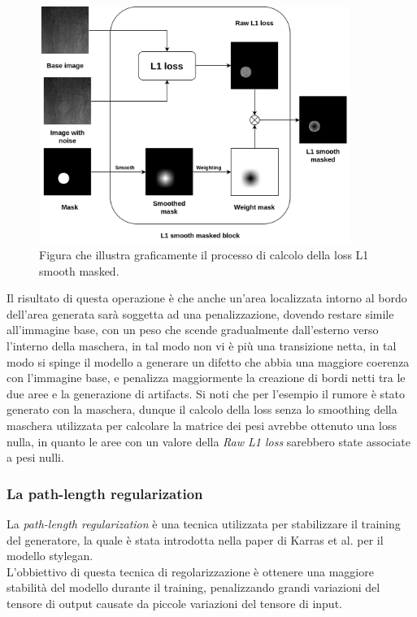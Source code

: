 \begin{figure}[H]
    \centering
    \includegraphics[width=0.9\textwidth]{imgs/Coigan/L1_smooth_masked.png}
    \caption{Figura che illustra graficamente il processo di calcolo della loss L1 smooth masked.}
    \label{fig:l1_smooth_masked_example}
\end{figure}

Il risultato di questa operazione è che anche un'area localizzata intorno al bordo dell'area generata sarà soggetta ad una penalizzazione, dovendo
restare simile all'immagine base, con un peso che scende gradualmente dall'esterno verso l'interno della maschera, in tal modo non vi è più 
una transizione netta, in tal modo si spinge il modello a generare un difetto che abbia una maggiore coerenza con l'immagine base, e penalizza maggiormente la
creazione di bordi netti tra le due aree e la generazione di artifacts.
Si noti che per l'esempio il rumore è stato generato con la maschera, dunque il calcolo della loss senza lo smoothing della maschera utilizzata per calcolare
la matrice dei pesi avrebbe ottenuto una loss nulla, in quanto le aree con un valore della \textit{Raw L1 loss} sarebbero state associate a pesi nulli.

\subsubsection{La path-length regularization}
La \textit{path-length regularization} è una tecnica utilizzata per stabilizzare il training del generatore, la quale è stata introdotta nella paper 
di Karras et al. \cite{karras2019stylegan} per il modello stylegan.\\
L'obbiettivo di questa tecnica di regolarizzazione è ottenere una maggiore stabilità del modello durante il training, penalizzando grandi variazioni del tensore di output
causate da piccole variazioni del tensore di input.

